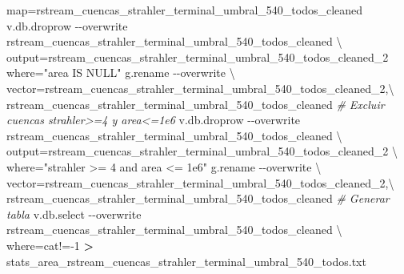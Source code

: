 \documentclass[spanish]{article}
\newenvironment{Shaded}{\begin{snugshade}}{\end{snugshade}}
\newcommand{\AttributeTok}[1]{\textcolor[rgb]{0.77,0.63,0.00}{#1}}
\newcommand{\CommentTok}[1]{\textcolor[rgb]{0.56,0.35,0.01}{\textit{#1}}}
\newcommand{\DataTypeTok}[1]{\textcolor[rgb]{0.13,0.29,0.53}{#1}}
\newcommand{\ExtensionTok}[1]{#1}
\newcommand{\NormalTok}[1]{#1}
\newcommand{\OperatorTok}[1]{\textcolor[rgb]{0.81,0.36,0.00}{\textbf{#1}}}
\newcommand{\StringTok}[1]{\textcolor[rgb]{0.31,0.60,0.02}{#1}}
\begin{document}
\begin{Shaded}
\begin{Highlighting}[]
\NormalTok{  map=rstream\_cuencas\_strahler\_terminal\_umbral\_540\_todos\_cleaned}
\ExtensionTok{v.db.droprow} \AttributeTok{{-}{-}overwrite}\NormalTok{ rstream\_cuencas\_strahler\_terminal\_umbral\_540\_todos\_cleaned }\DataTypeTok{\textbackslash{}}
\NormalTok{  output=rstream\_cuencas\_strahler\_terminal\_umbral\_540\_todos\_cleaned\_2 where=}\StringTok{"area IS NULL"}
\ExtensionTok{g.rename} \AttributeTok{{-}{-}overwrite} \DataTypeTok{\textbackslash{}}
\NormalTok{  vector=rstream\_cuencas\_strahler\_terminal\_umbral\_540\_todos\_cleaned\_2,}\DataTypeTok{\textbackslash{}}
\NormalTok{  rstream\_cuencas\_strahler\_terminal\_umbral\_540\_todos\_cleaned}
\CommentTok{\# Excluir cuencas strahler\textgreater{}=4 y area\textless{}=1e6}
\ExtensionTok{v.db.droprow} \AttributeTok{{-}{-}overwrite}\NormalTok{ rstream\_cuencas\_strahler\_terminal\_umbral\_540\_todos\_cleaned }\DataTypeTok{\textbackslash{}}
\NormalTok{  output=rstream\_cuencas\_strahler\_terminal\_umbral\_540\_todos\_cleaned\_2 }\DataTypeTok{\textbackslash{}}
\NormalTok{  where=}\StringTok{"strahler \textgreater{}= 4 and area \textless{}= 1e6"}
\ExtensionTok{g.rename} \AttributeTok{{-}{-}overwrite} \DataTypeTok{\textbackslash{}}
\NormalTok{  vector=rstream\_cuencas\_strahler\_terminal\_umbral\_540\_todos\_cleaned\_2,}\DataTypeTok{\textbackslash{}}
\NormalTok{  rstream\_cuencas\_strahler\_terminal\_umbral\_540\_todos\_cleaned}
\CommentTok{\# Generar tabla}
\ExtensionTok{v.db.select} \AttributeTok{{-}{-}overwrite}\NormalTok{ rstream\_cuencas\_strahler\_terminal\_umbral\_540\_todos\_cleaned }\DataTypeTok{\textbackslash{}}
\NormalTok{  where=}\StringTok{\textquotesingle{}cat!={-}1\textquotesingle{}} \OperatorTok{\textgreater{}}\NormalTok{ stats\_area\_rstream\_cuencas\_strahler\_terminal\_umbral\_540\_todos.txt}



\end{Highlighting}
\end{Shaded}
\end{document}
